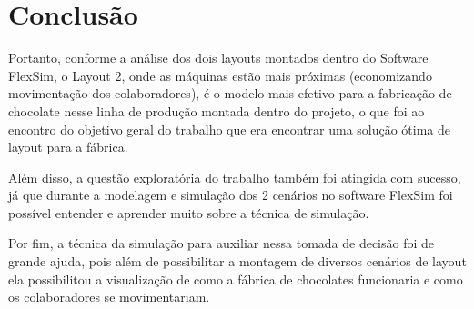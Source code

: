 \documentclass[
	12pt,				%
	openright,			%
	oneside,			%
	a4paper,			%
	english,			%
	french,				%
	spanish,			%
	brazil				%
	]{abntex2}
\begin{document}
\chapter{Conclusão}

Portanto, conforme a análise dos dois layouts montados dentro do Software FlexSim, o Layout 2, onde as máquinas estão mais próximas (economizando movimentação dos colaboradores), é o modelo mais efetivo para a fabricação de chocolate nesse linha de produção montada dentro do projeto, o que foi ao encontro do objetivo geral do trabalho que era encontrar uma solução ótima de layout para a fábrica. 

Além disso, a questão exploratória do trabalho também foi atingida com sucesso, já que durante a modelagem e simulação dos 2 cenários no software FlexSim foi possível entender e aprender muito sobre a técnica de simulação.

Por fim, a técnica da simulação para auxiliar nessa tomada de decisão foi de grande ajuda, pois além de possibilitar a montagem de diversos cenários de layout ela possibilitou a visualização de como a fábrica de chocolates funcionaria e como os colaboradores se movimentariam. 

\newpage
\postextual






\end{document}
